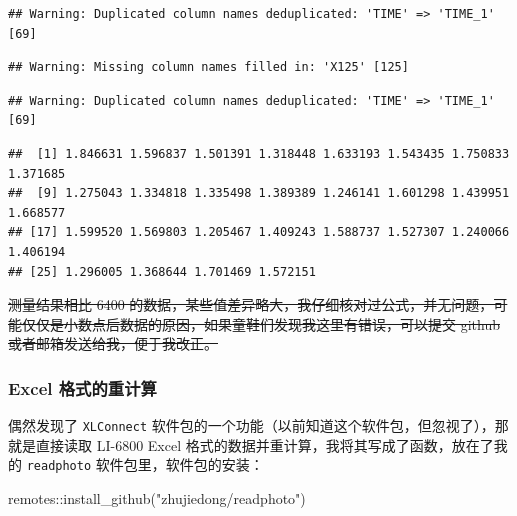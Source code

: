 \documentclass[
]{krantz}
\makeatletter
\newenvironment{Shaded}{\begin{snugshade}}{\end{snugshade}}
\newcommand{\FunctionTok}[1]{\textcolor[rgb]{0.00,0.00,0.00}{#1}}
\newcommand{\NormalTok}[1]{#1}
\newcommand{\SpecialCharTok}[1]{\textcolor[rgb]{0.00,0.00,0.00}{#1}}
\newcommand{\StringTok}[1]{\textcolor[rgb]{0.31,0.60,0.02}{#1}}
\newenvironment{kframe}{%
\medskip{}
\setlength{\fboxsep}{.8em}
 \def\at@end@of@kframe{}%
 \ifinner\ifhmode%
  \def\at@end@of@kframe{\end{minipage}}%
  \begin{minipage}{\columnwidth}%
 \fi\fi%
 \def\FrameCommand##1{\hskip\@totalleftmargin \hskip-\fboxsep
 \colorbox{shadecolor}{##1}\hskip-\fboxsep
     \hskip-\linewidth \hskip-\@totalleftmargin \hskip\columnwidth}%
 \MakeFramed {\advance\hsize-\width
   \@totalleftmargin\z@ \linewidth\hsize
   \@setminipage}}%
 {\par\unskip\endMakeFramed%
 \at@end@of@kframe}
\renewenvironment{Shaded}{\begin{kframe}}{\end{kframe}}
\makeatother
\begin{document}
\begin{verbatim}
## Warning: Duplicated column names deduplicated: 'TIME' => 'TIME_1' [69]
\end{verbatim}

\begin{verbatim}
## Warning: Missing column names filled in: 'X125' [125]
\end{verbatim}

\begin{verbatim}
## Warning: Duplicated column names deduplicated: 'TIME' => 'TIME_1' [69]
\end{verbatim}

\begin{Shaded}
\end{Shaded}

\begin{verbatim}
##  [1] 1.846631 1.596837 1.501391 1.318448 1.633193 1.543435 1.750833 1.371685
##  [9] 1.275043 1.334818 1.335498 1.389389 1.246141 1.601298 1.439951 1.668577
## [17] 1.599520 1.569803 1.205467 1.409243 1.588737 1.527307 1.240066 1.406194
## [25] 1.296005 1.368644 1.701469 1.572151
\end{verbatim}

\sout{测量结果相比 6400 的数据，某些值差异略大，我仔细核对过公式，并无问题，可能仅仅是小数点后数据的原因，如果童鞋们发现我这里有错误，可以提交 github 或者邮箱发送给我，便于我改正。}

\hypertarget{excel-recompute-68}{%
\subsubsection{Excel 格式的重计算}\label{excel-recompute-68}}

偶然发现了 \texttt{XLConnect} 软件包的一个功能（以前知道这个软件包，但忽视了），那就是直接读取 LI-6800 Excel 格式的数据并重计算，我将其写成了函数，放在了我的 \texttt{readphoto} 软件包里，软件包的安装：

\begin{Shaded}
\begin{Highlighting}[]
\NormalTok{remotes}\SpecialCharTok{::}\FunctionTok{install\_github}\NormalTok{(}\StringTok{"zhujiedong/readphoto"}\NormalTok{)}
\end{Highlighting}
\end{Shaded}
\end{document}
